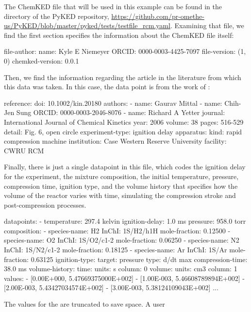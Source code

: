 \documentclass[12pt]{ussci}
\newcommand\ck{ChemKED}
\begin{document}
The \ck{} file that will be used in this example can be found in the
 directory of the PyKED repository,
\url{https://github.com/pr-omethe-us/PyKED/blob/master/pyked/tests/testfile_rcm.yaml}.
Examining that file, we find the first section specifies the information about
the \ck{} file itself:
%
\begin{yamlbox}
file-author:
  name: Kyle E Niemeyer
  ORCID: 0000-0003-4425-7097
file-version: (1, 0)
chemked-version: 0.0.1
\end{yamlbox}
%
Then, we find the information regarding the article in the literature from which
this data was taken. In this case, the data point is from the work of
\textcite{Mittal2006a}:
%
\begin{yamlbox}
reference:
  doi: 10.1002/kin.20180
  authors:
    - name: Gaurav Mittal
    - name: Chih-Jen Sung
      ORCID: 0000-0003-2046-8076
    - name: Richard A Yetter
  journal: International Journal of Chemical Kinetics
  year: 2006
  volume: 38
  pages: 516-529
  detail: Fig. 6, open circle
experiment-type: ignition delay
apparatus:
  kind: rapid compression machine
  institution: Case Western Reserve University
  facility: CWRU RCM
\end{yamlbox}
%
Finally, there is just a single datapoint in this file, which codes the ignition
delay for the experiment, the mixture composition, the initial temperature,
pressure, compression time, ignition type, and the volume history that specifies
how the volume of the reactor varies with time, simulating the compression
stroke and post-compression processes.
%
\begin{yamlbox}
datapoints:
  - temperature: 297.4 kelvin
    ignition-delay: 1.0 ms
    pressure: 958.0 torr
    composition:
      - species-name: H2
        InChI: 1S/H2/h1H
        mole-fraction: 0.12500
      - species-name: O2
        InChI: 1S/O2/c1-2
        mole-fraction: 0.06250
      - species-name: N2
        InChI: 1S/N2/c1-2
        mole-fraction: 0.18125
      - species-name: Ar
        InChI: 1S/Ar
        mole-fraction: 0.63125
    ignition-type:
      target: pressure
      type: d/dt max
    compression-time: 38.0 ms
    volume-history:
      time:
        units: s
        column: 0
      volume:
        units: cm3
        column: 1
      values:
        - [0.00E+000, 5.47669375000E+002]
        - [1.00E-003, 5.46608789894E+002]
        - [2.00E-003, 5.43427034574E+002]
        - [3.00E-003, 5.38124109043E+002]
        ...
\end{yamlbox}
%
The values for the  are truncated to save space. A user
\end{document}
